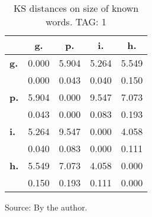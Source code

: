 \begin{table}[h!]
\begin{center}
\caption{KS distances on size of known words. TAG: 1}
\begin{tabular}{| l || c | c | c | c |}\hline
 & {\bf g.} & {\bf p.} & {\bf i.} & {\bf h.} \\\hline\hline
{\bf g.} & 0.000 & 5.904 & 5.264 & 5.549 \\
{\bf } & 0.000 & 0.043 & 0.040 & 0.150 \\\hline
{\bf p.} & 5.904 & 0.000 & 9.547 & 7.073 \\
{\bf } & 0.043 & 0.000 & 0.083 & 0.193 \\\hline
{\bf i.} & 5.264 & 9.547 & 0.000 & 4.058 \\
{\bf } & 0.040 & 0.083 & 0.000 & 0.111 \\\hline
{\bf h.} & 5.549 & 7.073 & 4.058 & 0.000 \\
{\bf } & 0.150 & 0.193 & 0.111 & 0.000 \\\hline
\end{tabular}
\begin{flushleft}
		Source: By the author.\
\end{flushleft}
\end{center}
\end{table} 
